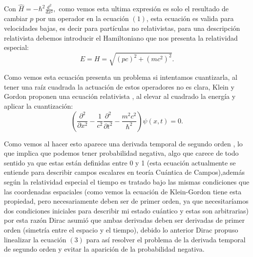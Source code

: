 \documentclass[twocolumn]{article}
\begin{document}
Con $\hat{H}= -\hbar^2 \frac{d^2}{dx^2} ,$  como vemos esta ultima expresión es solo el resultado de cambiar $p$ por un operador en la ecuación $(1)$, esta ecuación es valida para velocidades bajas, es decir para partículas no relativistas, para una descripción relativista debemos introducir el Hamiltoniano que nos presenta la relatividad especial:
\begin{equation}
   E=H=\sqrt{(pc)^2 + (mc^2)^2} .
\end{equation}

Como vemos esta ecuación presenta un problema si intentamos cuantizarla, al tener una raíz cuadrada la actuación de estos operadores no es clara, Klein y Gordon proponen una ecuación relativista , al  elevar al cuadrado la energía y aplicar la cuantización:
\begin{equation}
    (\frac{\partial^2}{\partial x^2}- \frac{1}{c^2}\frac{\partial^2}{\partial t^2}-\frac{m^2 c^2}{\hbar ^2})\psi(x,t)=0 .
\end{equation}

Como vemos al hacer esto aparece una derivada temporal de segundo orden , lo que implica que podemos tener probabilidad negativa, algo que carece de todo sentido ya que estas están definidas entre 0 y 1 (esta ecuación actualmente se entiende para describir campos escalares en teoría Cuántica de Campos),además según la relatividad especial el tiempo es tratado bajo las mismas condiciones que las coordenadas espaciales (como vemos la ecuación de Klein-Gordon tiene esta propiedad, pero necesariamente deben ser de primer orden, ya que necesitaríamos dos condiciones iniciales para describir mi estado cuántico y estas son arbitrarias) por esta razón Dirac asumió que ambas derivadas deben ser derivadas de primer orden (simetría entre el espacio y el tiempo), debido lo anterior Dirac propuso linealizar la ecuación $(3)$ para así resolver el problema de la derivada temporal de segundo orden y evitar la aparición de la probabilidad negativa.
\end{document}
